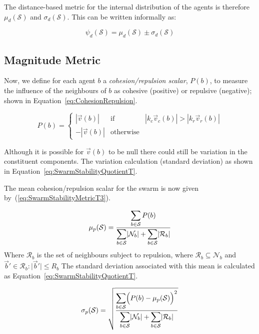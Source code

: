 \documentclass{ieeeaccess}
\newcommand{\magn}[1]{\vert{#1}\vert}
\begin{document}
The distance-based metric for the internal distribution of the agents is therefore $\mu_d(\mathcal S)$ and $\sigma_d(\mathcal S)$. This can be written informally as:

\begin{equation}
\label{eq:SwarmDistanceMetric}
\psi_d(\mathcal S) = \mu_d(\mathcal S)\pm \sigma_d(\mathcal S)
\end{equation}

\subsection{Magnitude Metric}

Now, we define for each agent $b$ a \textit{cohesion/repulsion scalar}, $P(b)$, to measure the influence of the neighbours of $b$ as cohesive (positive) or repulsive (negative); shown in Equation~\ref{eq:CohesionRepulsion}.

\begin{equation}
\label{eq:CohesionRepulsion}
P(b) = \left\{\begin{array}{lll}
               |\vec v(b)|& \mathrm{if} & |k_c \vec v_c(b)| > |k_r \vec v_r(b)|\\
              -|\vec v(b)|& \mathrm{otherwise}
              \end{array}\right.
\end{equation}

Although it is possible for $\vec v(b)$ to be null there could still be variation in the constituent components. The variation calculation (standard deviation) as shown in Equation~\ref{eq:SwarmStabilityQuotientT}. 

The mean cohesion/repulsion scalar for the swarm is now given by~(\ref{eq:SwarmStabilityMetricT3}).  

\begin{equation}
\label{eq:SwarmStabilityMetricT3}
\mu_p(\mathcal S) = \frac{\mathlarger{\sum_{b \in \mathcal S} P(b)}}{\mathlarger{\sum_{b \in \mathcal S}}|\mathcal{N}_b| + \mathlarger{\sum_{b \in \mathcal S}}|\mathcal R_b|}
\end{equation}
Where $\mathcal R_b$ is the set of neighbours subject to repulsion, 
where $\mathcal R_b \subseteq \mathcal N_b$ and $\vec b'\in\mathcal R_b:\magn{\vec b'}\leq R_b$
The standard deviation associated with this mean is calculated as Equation~\ref{eq:SwarmStabilityQuotientT}.

\begin{equation}
\label{eq:SwarmStabilityQuotientT}
\sigma_p(\mathcal S) = \sqrt{\frac{\mathlarger{\sum_{b \in \mathcal S}}\Big(P(b)-\mu_p(\mathcal S)\Big)^2}{\mathlarger{\sum_{b \in \mathcal S}}|\mathcal{N}_b| + \mathlarger{\sum_{b \in \mathcal S}}|\mathcal R_b|}}
\end{equation}
\end{document}
